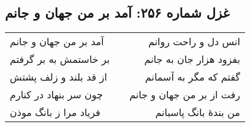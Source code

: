 \begin{center}
\section*{غزل شماره ۲۵۶: آمد بر من جهان و جانم}
\label{sec:256}
\begin{longtable}{l p{0.5cm} r}
آمد بر من جهان و جانم
&&
انس دل و راحت روانم
\\
بر خاستمش به بر گرفتم
&&
بفزود هزار جان به جانم
\\
از قد بلند و زلف پشتش
&&
گفتم که مگر به آسمانم
\\
چون سر بنهاد در کنارم
&&
رفت از بر من جهان و جانم
\\
فریاد مرا ز بانگ موذن
&&
من بندهٔ بانگ پاسبانم
\\
\end{longtable}
\end{center}

